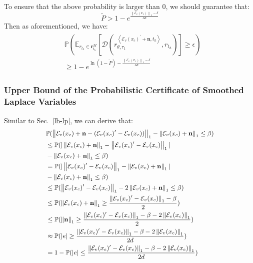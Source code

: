 To ensure that the above probability is larger than 0, we should guarantee that:
\begin{equation}
\tilde{P}>1 - e^{\frac{\left\|\mathcal{E}_v(x_c)\right\|_1-\delta}{\lambda d}}
\end{equation}
Then as aforementioned, we have:
\begin{align}
\begin{split}
&\mathbb{P}(\mathbb{E}_{r_{t_h}\in\mathbf{r}_{t_h}^M}[\mathcal{D}(r_{\theta, \tau_1}^{\left<\mathcal{E}_v(x_c)^{\prime}+\mathbf{n}, t_h\right>}, r_{t_h})]\geq\epsilon)\\
&\geq1 - e^{\ln(1-\tilde{P})-\frac{\left\|\mathcal{E}_v(x_c)\right\|_1-\delta}{\lambda d}}
\end{split}
\end{align}

\subsubsection{Upper Bound of the Probabilistic Certificate of Smoothed Laplace Variables}
\label{lb-up}
Similar to Sec.~\ref{lb-lp}, we can derive that:
\begin{align}
\small
\begin{split}
&\mathbb{P}(\left\|\mathcal{E}_v(x_c)+\mathbf{n}-(\mathcal{E}_v(x_c)^{\prime}-\mathcal{E}_v(x_c))\right\|_1-\left\|\mathcal{E}_v(x_c)+\mathbf{n}\right\|_1\leq\beta)\\
&\leq\mathbb{P}(|\left\|\mathcal{E}_v(x_c)+\mathbf{n}\right\|_1-\left\|\mathcal{E}_v(x_c)^{\prime}-\mathcal{E}_v(x_c)\right\|_1|\\
&-\left\|\mathcal{E}_v(x_c)+\mathbf{n}\right\|_1\leq\beta)\\
&=\mathbb{P}(|\left\|\mathcal{E}_v(x_c)^{\prime}-\mathcal{E}_v(x_c)\right\|_1-\left\|\mathcal{E}_v(x_c)+\mathbf{n}\right\|_1|\\
&-\left\|\mathcal{E}_v(x_c)+\mathbf{n}\right\|_1\leq\beta)\\
&\leq\mathbb{P}(\left\|\mathcal{E}_v(x_c)^{\prime}-\mathcal{E}_v(x_c)\right\|_1-2\left\|\mathcal{E}_v(x_c)+\mathbf{n}\right\|_1\leq\beta)\\
&\leq\mathbb{P}(\left\|\mathcal{E}_v(x_c)+\mathbf{n}\right\|_1\geq\frac{\left\|\mathcal{E}_v(x_c)^{\prime}-\mathcal{E}_v(x_c)\right\|_1-\beta}{2})\\
&\leq\mathbb{P}(\left\|\mathbf{n}\right\|_1\geq\frac{\left\|\mathcal{E}_v(x_c)^{\prime}-\mathcal{E}_v(x_c)\right\|_1-\beta-2\left\|\mathcal{E}_v(x_c)\right\|_1}{2})\\
&\approx\mathbb{P}(|e|\geq\frac{\left\|\mathcal{E}_v(x_c)^{\prime}-\mathcal{E}_v(x_c)\right\|_1-\beta-2\left\|\mathcal{E}_v(x_c)\right\|_1}{2d})\\
&=1-\mathbb{P}(|e|\leq\frac{\left\|\mathcal{E}_v(x_c)^{\prime}-\mathcal{E}_v(x_c)\right\|_1-\beta-2\left\|\mathcal{E}_v(x_c)\right\|_1}{2d})
\end{split}
\end{align}
